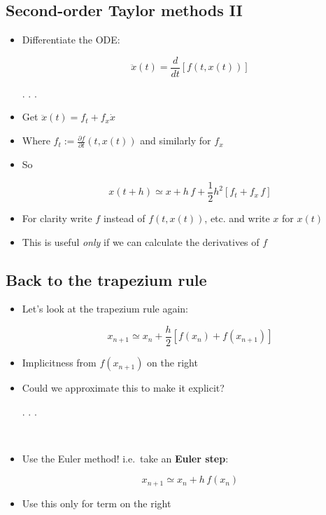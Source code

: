 \documentclass[
]{article}
\begin{document}
\hypertarget{second-order-taylor-methods-ii}{%
\subsection{Second-order Taylor methods
II}\label{second-order-taylor-methods-ii}}

\begin{itemize}
\item
  Differentiate the ODE:

  \[\ddot{x}(t) = \textstyle \frac{d}{dt} \left[ f(t, x(t)) \right]\]

  . . .
\item
  Get \(\ddot{x}(t) = f_t + f_x \dot{x}\)
\item
  Where \(f_t := \frac{\partial{f}}{\partial t}(t, x(t))\) and similarly
  for \(f_x\)
\item
  So

  \[x(t + h) \simeq x + h \, f + \textstyle \frac{1}{2} h^2 \left[ f_t + f_x \, f \right]\]
\item
  For clarity write \(f\) instead of \(f(t, x(t))\), etc. and write
  \(x\) for \(x(t)\)
\item
  This is useful \emph{only} if we can calculate the derivatives of
  \(f\)
\end{itemize}

\hypertarget{back-to-the-trapezium-rule}{%
\subsection{Back to the trapezium
rule}\label{back-to-the-trapezium-rule}}

\begin{itemize}
\item
  Let's look at the trapezium rule again:

  \[ x_{n+1} \simeq x_n + \textstyle \frac{h}{2} \left[ f(x_n) + f(x_{n+1}) \right]\]
\item
  Implicitness from \(f(x_{n+1})\) on the right
\item
  Could we approximate this to make it explicit?

  . . .

  ~\\
\item
  Use the Euler method! i.e.~take an \textbf{Euler step}:

  \[x_{n+1} \simeq x_n + h \, f(x_n)\]
\item
  Use this only for term on the right
\end{itemize}
\end{document}

